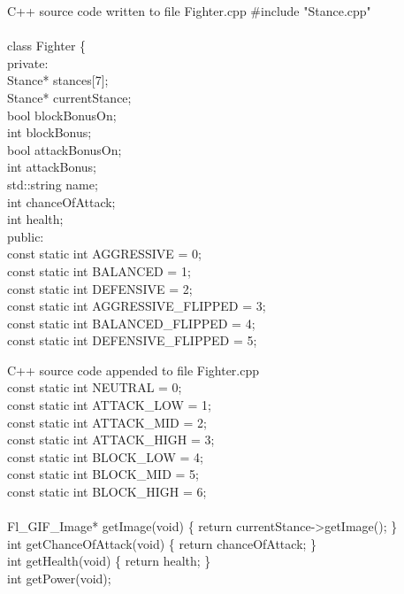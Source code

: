 \documentclass{article}
\begin{document}
\begin{GFT}{C++ source code written to file Fighter.cpp}
\+\#include "Stance.cpp"\\
\+\\
\+class Fighter \{\\
\+    private:\\
\+        Stance* stances[7];\\
\+        Stance* currentStance;\\
\+        bool blockBonusOn;\\
\+        int blockBonus;\\
\+        bool attackBonusOn;\\
\+        int attackBonus;\\
\+        std::string name;\\
\+        int chanceOfAttack;\\
\+        int health;\\
\+    public:\\
\+        const static int AGGRESSIVE = 0;\\
\+        const static int BALANCED = 1;\\
\+        const static int DEFENSIVE = 2;\\
\+        const static int AGGRESSIVE\_FLIPPED = 3;\\
\+        const static int BALANCED\_FLIPPED = 4;\\
\+        const static int DEFENSIVE\_FLIPPED = 5;\\
\end{GFT}
\clearpage
\begin{GFT}{C++ source code appended to file Fighter.cpp}
\+\\
\+        const static int NEUTRAL = 0;\\
\+        const static int ATTACK\_LOW = 1;\\
\+        const static int ATTACK\_MID = 2;\\
\+        const static int ATTACK\_HIGH = 3;\\
\+        const static int BLOCK\_LOW = 4;\\
\+        const static int BLOCK\_MID = 5;\\
\+        const static int BLOCK\_HIGH = 6;\\
\+\\
\+        Fl\_GIF\_Image* getImage(void) \{ return currentStance->getImage(); \}\\
\+        int getChanceOfAttack(void) \{ return chanceOfAttack; \}\\
\+        int getHealth(void) \{ return health; \}\\
\+        int getPower(void);\\
\end{GFT}
\end{document}
